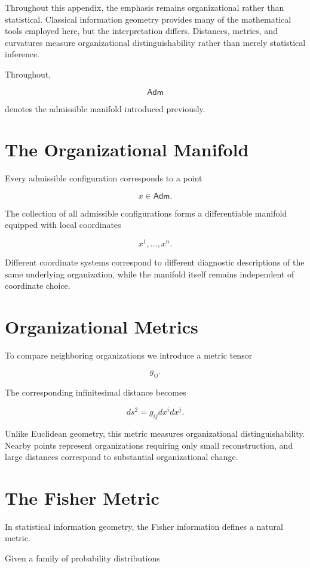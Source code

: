 \documentclass[11pt,oneside]{book}
\numberwithin{equation}{chapter}
\theoremstyle{definition}
\theoremstyle{plain}
\newcommand{\Adm}{\mathsf{Adm}}
\begin{document}
Throughout this appendix, the emphasis remains organizational rather than
statistical. Classical information geometry provides many of the
mathematical tools employed here, but the interpretation differs.
Distances, metrics, and curvatures measure organizational
distinguishability rather than merely statistical inference.

Throughout,

\[
\Adm
\]

denotes the admissible manifold introduced previously.

\section{The Organizational Manifold}

Every admissible configuration corresponds to a point

\[
x
\in
\Adm.
\]

The collection of all admissible configurations forms a differentiable
manifold equipped with local coordinates

\[
x^1,\ldots,x^n.
\]

Different coordinate systems correspond to different diagnostic descriptions of the same underlying organization, while the manifold itself remains independent of coordinate choice.

\section{Organizational Metrics}

To compare neighboring organizations we introduce a metric tensor

\[
g_{ij}.
\]

The corresponding infinitesimal distance becomes

\[
ds^2
=
g_{ij}
dx^i
dx^j.
\]

Unlike Euclidean geometry, this metric measures organizational distinguishability. Nearby points represent organizations requiring only small reconstruction, and large distances correspond to substantial organizational change.

\section{The Fisher Metric}

In statistical information geometry, the Fisher information defines a
natural metric.

Given a family of probability distributions
\end{document}
